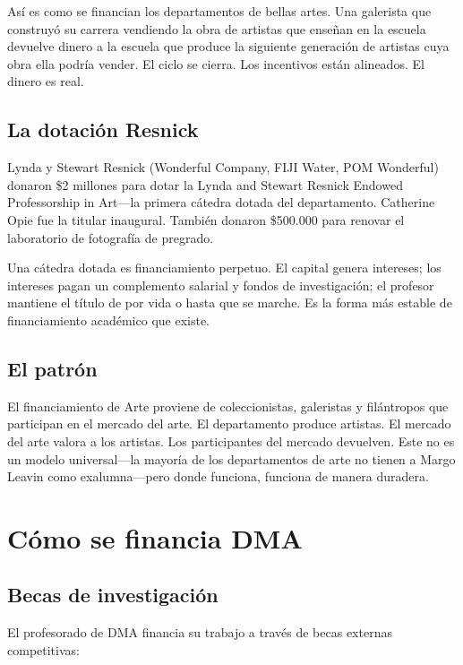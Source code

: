 \documentclass[10pt,letterpaper,twocolumn]{article}
\newcommand{\dma}{\textsc{DMA}}
\begin{document}
Así es como se financian los departamentos de bellas artes. Una galerista que construyó su carrera vendiendo la obra de artistas que enseñan en la escuela devuelve dinero a la escuela que produce la siguiente generación de artistas cuya obra ella podría vender. El ciclo se cierra. Los incentivos están alineados. El dinero es real.

\subsection{La dotación Resnick}

Lynda y Stewart Resnick (Wonderful Company, FIJI Water, POM Wonderful) donaron \$2 millones para dotar la Lynda and Stewart Resnick Endowed Professorship in Art---la primera cátedra dotada del departamento. Catherine Opie fue la titular inaugural. También donaron \$500.000 para renovar el laboratorio de fotografía de pregrado.

Una cátedra dotada es financiamiento perpetuo. El capital genera intereses; los intereses pagan un complemento salarial y fondos de investigación; el profesor mantiene el título de por vida o hasta que se marche. Es la forma más estable de financiamiento académico que existe.

\subsection{El patrón}

El financiamiento de Arte proviene de coleccionistas, galeristas y filántropos que participan en el mercado del arte. El departamento produce artistas. El mercado del arte valora a los artistas. Los participantes del mercado devuelven. Este no es un modelo universal---la mayoría de los departamentos de arte no tienen a Margo Leavin como exalumna---pero donde funciona, funciona de manera duradera.

\section{Cómo se financia DMA}

\subsection{Becas de investigación}

El profesorado de \dma{} financia su trabajo a través de becas externas competitivas:
\end{document}
